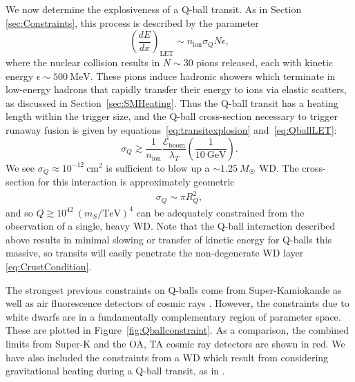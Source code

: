\documentclass[twocolumn, preprintnumbers,amsmath,amssymb,prd, superscriptaddress]{revtex4}
\newcommand{\Eboom}{\mathcal{E}_\text{boom}}
\newcommand{\GeV}{\text{GeV}}
\def\r{\right)}
\def\l{\left(}
\begin{document}
We now determine the explosiveness of a Q-ball transit.
As in Section \ref{sec:Constraints}, this process is described by the parameter
\begin{equation}
\label{eq:QballLET}
\l\frac{dE}{dx}\r_\text{LET} \sim n_\text{ion} \sigma_Q N \epsilon,
\end{equation}
where the nuclear collision results in $N \sim 30$ pions released, each with kinetic energy $\epsilon \sim 500 ~\text{MeV}$.
These pions induce hadronic showers which terminate in low-energy hadrons that rapidly transfer their energy to ions via elastic scatters, as discussed in Section~\ref{sec:SMHeating}.
Thus the Q-ball transit has a heating length within the trigger size, and the Q-ball cross-section necessary to trigger runaway fusion is given by equations~\eqref{eq:transitexplosion} and~\eqref{eq:QballLET}:
\begin{equation}
 \sigma_Q \gtrsim \frac{1}{n_\text{ion}} \frac{\Eboom}{\lambda_T}
 \l \frac{1}{10~\GeV} \r.
\end{equation}
We see $\sigma_Q \approx 10^{-12} ~\text{cm}^2$ is sufficient to blow up a $\sim 1.25 ~M_{\astrosun}$ WD.
The cross-section for this interaction is approximately geometric
\begin{align}
\sigma_Q \sim \pi R_Q^2,
\end{align}
and so $Q \gtrsim 10^{42} ~(m_S/\text{TeV})^4$ can be adequately constrained from the observation of a single, heavy WD.
Note that the Q-ball interaction described above results in minimal slowing or transfer of kinetic energy for Q-balls this massive, so transits will easily penetrate the non-degenerate WD layer \eqref{eq:CrustCondition}.

The strongest previous constraints on Q-balls come from Super-Kamiokande as well as air fluorescence detectors of cosmic rays \cite{Dine:2003ax}.
However, the constraints due to white dwarfs are in a fundamentally complementary region of parameter space.
These are plotted in Figure~\ref{fig:Qballconstraint}.
As a comparison, the combined limits from Super-K and the OA, TA cosmic ray detectors are shown in red.
We have also included the constraints from a WD which result from considering gravitational heating during a Q-ball transit, as in \cite{Graham:2015apa}.
\end{document}
